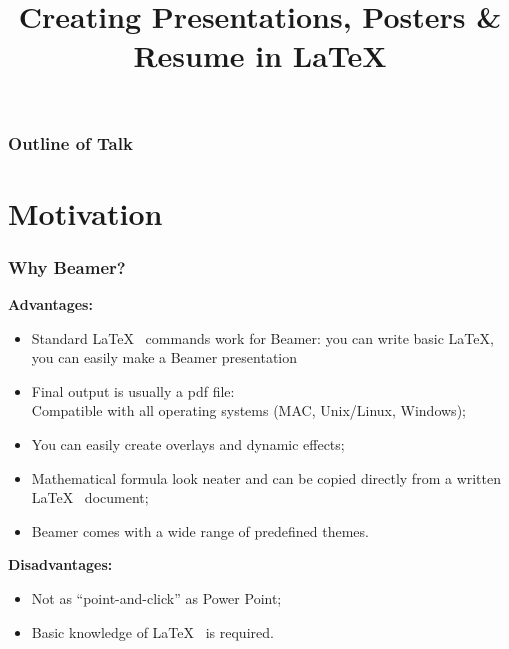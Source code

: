 \documentclass[[newPxFont]{beamer}
\author[{\tiny Dr. D. Aravinthan @ Online Training Programme on \LaTeX }]
{%
   \texorpdfstring{
        \begin{columns}
            \column{.45\linewidth}
            \centering
            \RBox{\textbf{\Large Dr. D. Aravinthan}}
          \end{columns}
        \begin{center}
        \begin{columns}
          \column{0.90\linewidth}
            \centering
            \begin{footnotesize}
            Guest Faculty\\
            Department of Physics\\
            Central University of Tamilnadu\\
		Tiruvarur - 610 015
            \end{footnotesize}\\
		     \vspace{1cm}
		     \begin{columns}
            \column{.75\linewidth}
            \centering
            \RBox{\textbf{Summer Online Training Programme on \LaTeX}}
        \end{columns}
        \vspace{0.2cm}
         \begin{footnotesize}
          June  18, 2020\\
                   \vspace{0.25cm}
         \textbf{Jamal Mohamed College (Autonomous)\\
          Tiruchirappalli – 620 020.}              
          \end{footnotesize}\\
        \end{columns}
        \end{center}
           }
   {}
}
\title[{\tiny Creating PPTs, Posters \& Resume in \LaTeX~~\insertframenumber/\inserttotalframenumber}]{\textbf{Creating Presentations, Posters \& Resume in \LaTeX}}
\begin{document}
\begin{frame}[plain]
\vspace{0.5cm}
\maketitle
\end{frame}
\section[Outline]{}	%
\begin{frame}
\frametitle{Outline of Talk}
\tableofcontents[pausesections]
\end{frame}
\iftrue
\section{Motivation}	%
\begin{frame}
\frametitle{Why Beamer?}
\begin{small}
\textbf{Advantages:}
\begin{itemize}
  \item Standard \LaTeX~ commands work for Beamer: you can write basic \LaTeX,~ you can easily make a Beamer presentation
\pause
\item Final output is usually a {\color{red}pdf file:\\
 Compatible with all operating systems (MAC, Unix/Linux, Windows);}
\pause
\item You can easily create overlays and dynamic effects;
\pause
\item Mathematical formula look neater and can be copied directly from a written \LaTeX~ document;
\pause
\item Beamer comes with a wide range of predefined themes.
\pause
\end{itemize}
\textbf{Disadvantages:}
\begin{itemize}
  \item Not as “point-and-click” as Power Point;
\pause
\item Basic knowledge of \LaTeX~ is required.
\end{itemize}
\end{small}
\end{frame}
\end{document}
